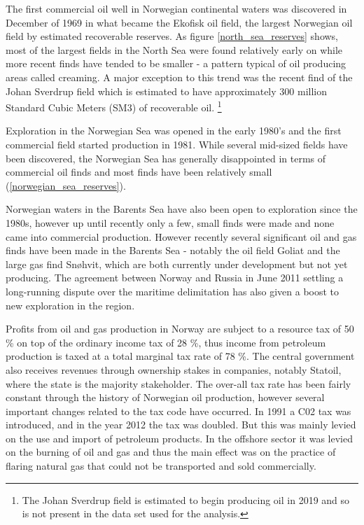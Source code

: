\documentclass[11pt]{article}
\begin{document}
The first commercial oil well in Norwegian continental waters was discovered in December of 1969 in what became the Ekofisk oil field, the largest Norwegian oil field by estimated recoverable reserves.  As figure \ref{north_sea_reserves} shows, most of the largest fields in the North Sea were found relatively early on while more recent finds have tended to be smaller - a pattern typical of oil producing areas called creaming.  A major exception to this trend was the recent find of the Johan Sverdrup field which is estimated to have approximately 300 million Standard Cubic Meters (SM3) of recoverable oil. \footnote{The Johan Sverdrup field is estimated to begin producing oil in 2019 and so is not present in the data set used for the analysis.}  


Exploration in the Norwegian Sea was opened in the early 1980’s and the first commercial field started production in 1981.  While several mid-sized fields have been discovered, the Norwegian Sea has generally disappointed in terms of commercial oil finds and most finds have been relatively small (\ref{norwegian_sea_reserves}).  

Norwegian waters in the Barents Sea have also been open to exploration since the 1980s, however up until recently only a few, small finds were made and none came into commercial production.  However recently several significant oil and gas finds have been made in the Barents Sea - notably the oil field Goliat and the large gas find Sn\o hvit, which are both currently under development but not yet producing.  The agreement between Norway and Russia in June 2011 settling a long-running dispute over the maritime delimitation has also given a boost to new exploration in the region.  

Profits from oil and gas production in Norway are subject to a resource tax of 50 \% on top of the ordinary income tax of 28 \%, thus income from petroleum production is taxed at a total marginal tax rate of 78 \%.  The central government also receives revenues through ownership stakes in companies, notably Statoil, where the state is the majority stakeholder.  The over-all tax rate has been fairly constant through the history of Norwegian oil production, however several important changes related to the tax code have occurred.  In 1991 a C02 tax was introduced, and in the year 2012 the tax was doubled.  But this was mainly levied on the use and import of petroleum products.  In the offshore sector it was levied on the burning of oil and gas and thus the main effect was on the practice of flaring natural gas that could not be transported and sold commercially.   
\end{document}
